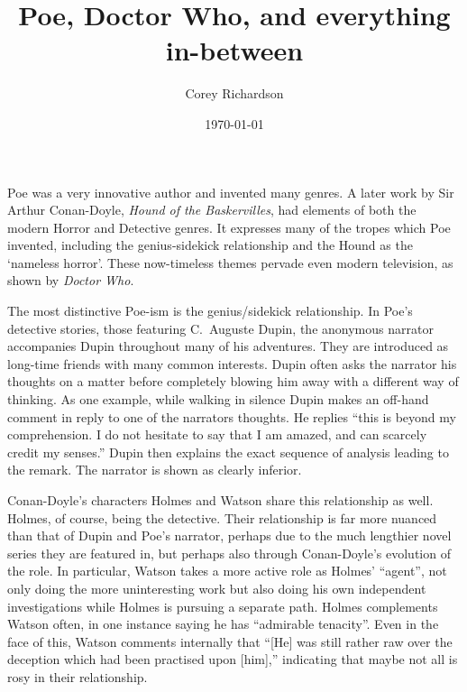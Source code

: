 \documentclass[12pt]{article}
\title{Poe, Doctor Who, and everything in-between}
\date{\today}
\author{Corey Richardson}
\begin{document}
\setlength{\parindent}{1in}

\maketitle
\thispagestyle{empty}
\newpage
\setcounter{page}{1}

Poe was a very innovative author and invented many genres. A later work by Sir
Arthur Conan-Doyle, \emph{Hound of the Baskervilles}, had elements of both the
modern Horror and Detective genres. It expresses many of the tropes which Poe
invented, including the genius-sidekick relationship and the Hound as the
`nameless horror'. These now-timeless themes pervade even modern television,
as shown by \emph{Doctor Who}.

The most distinctive Poe-ism is the genius/sidekick relationship. In Poe's
detective stories, those featuring C.\ Auguste Dupin, the anonymous narrator
accompanies Dupin throughout many of his adventures. They are introduced as
long-time friends with many common interests. Dupin often asks the narrator
his thoughts on a matter before completely blowing him away with a different
way of thinking. As one example, while walking in silence Dupin makes an
off-hand comment in reply to one of the narrators thoughts. He replies ``this
is beyond my comprehension. I do not hesitate to say that I am amazed, and can
scarcely credit my senses.'' Dupin then explains the exact sequence of
analysis leading to the remark. The narrator is shown as clearly inferior.

Conan-Doyle's characters Holmes and Watson share this relationship as well.
Holmes, of course, being the detective. Their relationship is far more nuanced
than that of Dupin and Poe's narrator, perhaps due to the much lengthier novel
series they are featured in, but perhaps also through Conan-Doyle's evolution
of the role. In particular, Watson takes a more active role as Holmes'
``agent'', not only doing the more uninteresting work but also doing his own
independent investigations while Holmes is pursuing a separate path. Holmes
complements Watson often, in one instance saying he has ``admirable
tenacity''. Even in the face of this, Watson comments internally that ``[He] was
still rather raw over the deception which had been practised upon [him],''
indicating that maybe not all is rosy in their relationship.
\end{document}
